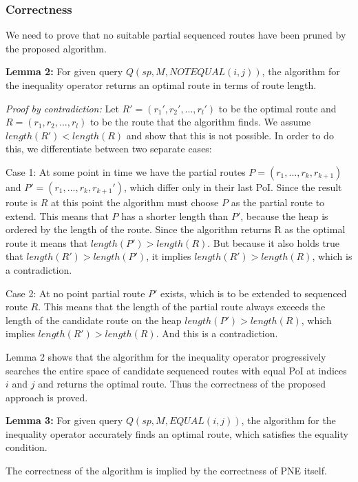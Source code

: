 \subsubsection{Correctness}
\label{sec:correctnessNEO}
We need to prove that no suitable partial sequenced routes have been pruned by the proposed algorithm.

\textbf{Lemma 2:} For given query $Q(sp, M, NOTEQUAL(i, j))$, the algorithm for the inequality operator returns an optimal route in terms of route length.

\textit{Proof by contradiction:} Let $R' = (r_1', r_2', ..., r_l')$ to be the optimal route and $R = (r_1, r_2, ..., r_l)$ to be the route that the algorithm finds. We assume $length(R') < length(R)$ and show that this is not possible. In order to do this, we differentiate between two separate cases: 

Case 1: At some point in time we have the partial routes $P = (r_1, ..., r_k, r_{k+1})$ and $P' = (r_1, ..., r_k, r_{k+1}')$, which differ only in their last PoI. Since the result route is $R$ at this point the algorithm must choose $P$ as the partial route to extend. This means that $P$ has a shorter length than $P'$, because the heap is ordered by the length of the route. Since the algorithm returns R as the optimal route it means that $length(P') > length(R)$. But because it also holds true that $length(R') > length(P')$, it implies $length(R') > length(R)$, which is a contradiction.

Case 2: At no point partial route $P'$ exists, which is to be extended to sequenced route $R$. This means that the length of the partial route always exceeds the length of the candidate route on the heap $length(P') > length(R)$, which implies $length(R') > length(R)$. And this is a contradiction.

Lemma 2 shows that the algorithm for the inequality operator progressively searches the entire space of candidate sequenced routes with equal PoI at indices $i$ and $j$ and returns the optimal route. Thus the correctness of the proposed approach is proved.

\textbf{Lemma 3:} For given query $Q(sp, M, EQUAL(i, j))$, the algorithm for the inequality operator accurately finds an optimal route, which satisfies the equality condition.

The correctness of the algorithm is implied by the correctness of PNE itself.
